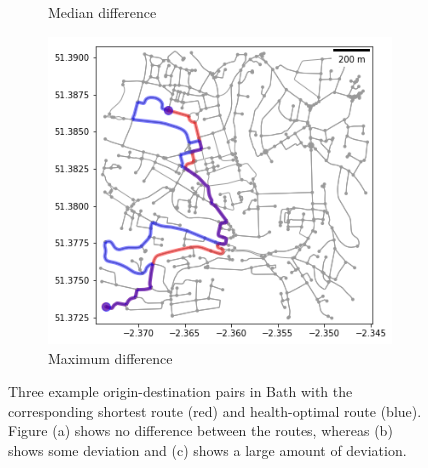 \documentclass[11pt,twosided,a4paper]{report}
\begin{document}
\begin{figure}[!tb]
\begin{minipage}{1\linewidth}
\begin{subfigure}[t]{.5\linewidth}
            	\caption{Median difference}
            	\label{fig:route_median}
	   \end{subfigure}
        \end{minipage}
    \begin{minipage}{1\linewidth}
    	\centering
        \begin{subfigure}[t]{.5\linewidth}
            \includegraphics[width=\textwidth]{images/health_optimal_route_max}
            \caption{Maximum difference}
            \label{fig:route_max}
        \end{subfigure}
    \end{minipage}
    \caption[Example routes.]{Three example origin-destination pairs in Bath with the corresponding shortest route (red) and health-optimal route (blue). Figure (a) shows no difference between the routes, whereas (b) shows some deviation and (c) shows a large amount of deviation.}
    \label{fig:origdestpairs}
\end{figure}
\end{document}
